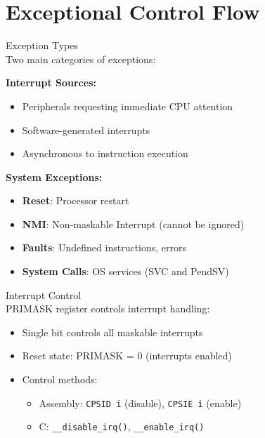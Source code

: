 \section{Exceptional Control Flow}

\begin{concept}{Exception Types}\\
Two main categories of exceptions:

\textbf{Interrupt Sources:}
\begin{itemize}
  \item Peripherals requesting immediate CPU attention
  \item Software-generated interrupts
  \item Asynchronous to instruction execution
\end{itemize}

\textbf{System Exceptions:}
\begin{itemize}
  \item \textbf{Reset}: Processor restart
  \item \textbf{NMI}: Non-maskable Interrupt (cannot be ignored)
  \item \textbf{Faults}: Undefined instructions, errors
  \item \textbf{System Calls}: OS services (SVC and PendSV)
\end{itemize}
\end{concept}

\begin{definition}{Interrupt Control}\\
PRIMASK register controls interrupt handling:
\begin{itemize}
  \item Single bit controls all maskable interrupts
  \item Reset state: PRIMASK = 0 (interrupts enabled)
  \item Control methods:
    \begin{itemize}
      \item Assembly: \texttt{CPSID i} (disable), \texttt{CPSIE i} (enable)
      \item C: \texttt{\_\_disable\_irq()}, \texttt{\_\_enable\_irq()}
    \end{itemize}
\end{itemize}
\end{definition}

